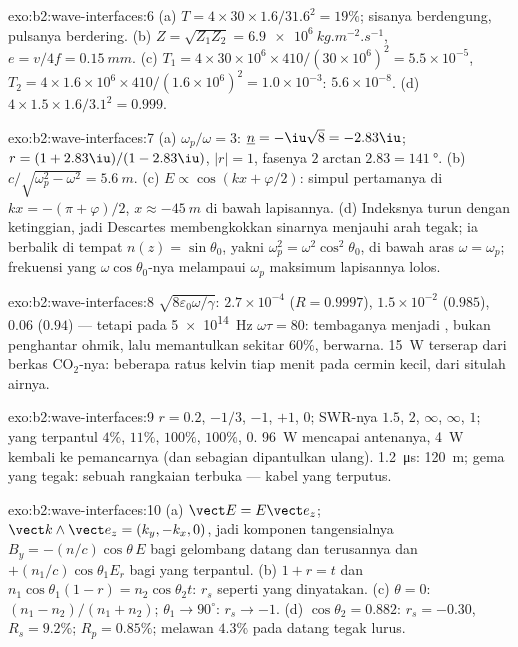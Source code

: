 \begin{solution}{exo:b2:wave-interfaces:6}
(a) $T = 4 \times 30 \times 1.6/31.6^2 = 19\%$; sisanya berdengung, pulsanya
berdering. (b) $Z = \sqrt{Z_1Z_2} = \qty{6.9e6}{kg.m^{-2}.s^{-1}}$, $e = v/4f = \qty{0.15}{mm}$.
(c) $T_1 = 4 \times 30 \times 10^6 \times 410/(30 \times 10^6)^2 = 5.5 \times 10^{-5}$, $T_2 = 4 \times 1.6 \times
10^6 \times 410/(1.6 \times 10^6)^2 = 1.0 \times 10^{-3}$: $5.6 \times 10^{-8}$. (d) $4 \times 1.5 \times 1.6/
3.1^2 = 0.999$.
\end{solution}

\begin{solution}{exo:b2:wave-interfaces:7}
(a) $\omega_p/\omega = 3$: $\underline n = -\iu\sqrt8 = -2.83\iu$; $r = (1 + 2.83\iu)/(1 - 2.83
\iu)$, $|r| = 1$, fasenya $2\arctan2.83 = \qty{141}{\degree}$. (b) $c/\sqrt{\omega_p^2 - \omega^2}
= \qty{5.6}{m}$. (c) $E \propto \cos(kx + \varphi/2)$: simpul pertamanya di $kx = -(\pi + \varphi)/2$,
$x \approx \qty{-45}{m}$ di bawah lapisannya. (d) Indeksnya turun dengan ketinggian, jadi
Descartes membengkokkan sinarnya menjauhi arah tegak; ia berbalik di tempat
$n(z) = \sin\theta_0$, yakni $\omega_p^2 = \omega^2\cos^2\theta_0$, di bawah aras $\omega = \omega_p$;
frekuensi yang $\omega\cos\theta_0$-nya melampaui $\omega_p$ maksimum lapisannya
lolos.
\end{solution}

\begin{solution}{exo:b2:wave-interfaces:8}
$\sqrt{8\varepsilon_0\omega/\gamma}$: $2.7 \times 10^{-4}$ ($R = 0.9997$), $1.5 \times 10^{-2}$ ($0.985$),
$0.06$ ($0.94$) --- tetapi pada \qty{5e14}{Hz} $\omega\tau = 80$: tembaganya menjadi ,
bukan penghantar ohmik, lalu memantulkan sekitar $60\%$, berwarna. \qty{15}{W}
terserap dari berkas CO$_2$-nya: beberapa ratus kelvin tiap menit pada
cermin kecil, dari situlah airnya.
\end{solution}

\begin{solution}{exo:b2:wave-interfaces:9}
$r = 0.2$, $-1/3$, $-1$, $+1$, $0$; SWR-nya $1.5$, $2$, $\infty$, $\infty$, $1$; yang terpantul
$4\%$, $11\%$, $100\%$, $100\%$, $0$. \qty{96}{W} mencapai antenanya, \qty{4}{W}
kembali ke pemancarnya (dan sebagian dipantulkan ulang). \qty{1.2}{\micro s}:
\qty{120}{m}; gema yang tegak: sebuah rangkaian terbuka --- kabel yang terputus.
\end{solution}

\begin{solution}{exo:b2:wave-interfaces:10}
(a) $\vect E = E\vect e_z$; $\vect k\wedge\vect e_z = (k_y, -k_x, 0)$, jadi komponen tangensialnya
$B_y = -(n/c)\cos\theta\,E$ bagi gelombang datang dan terusannya dan
$+(n_1/c)\cos\theta_1E_r$ bagi yang terpantul. (b) $1 + r = t$ dan $n_1\cos\theta_1
(1 - r) = n_2\cos\theta_2t$: $r_s$ seperti yang dinyatakan. (c) $\theta = 0$: $(n_1 - n_2)/(n_1 +
n_2)$; $\theta_1 \to 90^\circ$: $r_s \to -1$. (d) $\cos\theta_2 = 0.882$: $r_s = -0.30$, $R_s =
9.2\%$; $R_p = 0.85\%$; melawan $4.3\%$ pada datang tegak lurus.
\end{solution}

